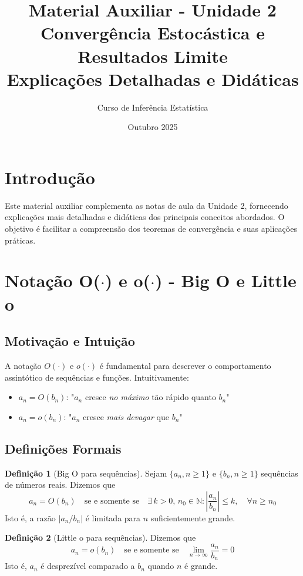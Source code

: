 \documentclass[12pt,a4paper]{article}
\title{Material Auxiliar - Unidade 2\\
\large Convergência Estocástica e Resultados Limite\\
\normalsize Explicações Detalhadas e Didáticas}
\author{Curso de Inferência Estatística}
\date{Outubro 2025}
\theoremstyle{definition}
\newtheorem{definicao}{Definição}[section]
\theoremstyle{plain}
\begin{document}
\maketitle
\tableofcontents
\newpage

\section{Introdução}

Este material auxiliar complementa as notas de aula da Unidade 2, fornecendo explicações mais detalhadas e didáticas dos principais conceitos abordados. O objetivo é facilitar a compreensão dos teoremas de convergência e suas aplicações práticas.

\section{Notação O($\cdot$) e o($\cdot$) - Big O e Little o}

\subsection{Motivação e Intuição}

A notação $O(\cdot)$ e $o(\cdot)$ é fundamental para descrever o comportamento assintótico de sequências e funções. Intuitivamente:

\begin{itemize}
    \item \textbf{$a_n = O(b_n)$}: "$a_n$ cresce \emph{no máximo} tão rápido quanto $b_n$"
    \item \textbf{$a_n = o(b_n)$}: "$a_n$ cresce \emph{mais devagar} que $b_n$"
\end{itemize}

\subsection{Definições Formais}

\begin{definicao}[Big O para sequências]
Sejam $\{a_n, n \geq 1\}$ e $\{b_n, n \geq 1\}$ sequências de números reais. Dizemos que
\[
a_n = O(b_n) \quad \text{se e somente se} \quad \exists\, k > 0,\, n_0 \in \mathbb{N} : \left|\frac{a_n}{b_n}\right| \leq k, \quad \forall n \geq n_0
\]
Isto é, a razão $|a_n/b_n|$ é limitada para $n$ suficientemente grande.
\end{definicao}

\begin{definicao}[Little o para sequências]
Dizemos que
\[
a_n = o(b_n) \quad \text{se e somente se} \quad \lim_{n \to \infty} \frac{a_n}{b_n} = 0
\]
Isto é, $a_n$ é desprezível comparado a $b_n$ quando $n$ é grande.
\end{definicao}
\end{document}
